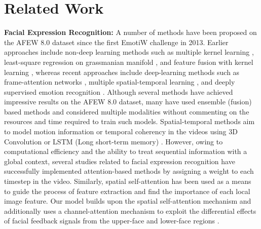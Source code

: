 \documentclass[runningheads]{llncs}
\begin{document}
\section{Related Work} \label{sec: related}
\textbf{Facial Expression Recognition:} A number of methods have been proposed on the AFEW 8.0 dataset \cite{dhall2012collecting} since the first EmotiW \cite{dhall2019emotiw} challenge in 2013. Earlier approaches include non-deep learning methods such as multiple kernel learning \cite{sikka2013multiple}, least-square regression on grassmanian manifold \cite{liu2013partial}, and feature fusion with kernel learning \cite{chen2014emotion}, whereas recent approaches include deep-learning methods such as frame-attention networks \cite{meng2019frame}, multiple spatial-temporal learning \cite{lu2018multiple}, and deeply supervised emotion recognition \cite{fan2018video}. Although several methods \cite{fan2018video,lu2018multiple,vielzeuf2017temporal,liu2018multi} have achieved impressive results on the AFEW 8.0 dataset, many have used ensemble (fusion) based methods and considered multiple modalities without commenting on the resources and time required to train such models. 
Spatial-temporal methods \cite{vielzeuf2017temporal,fan2016video} aim to model motion information or temporal coherency in the videos  using 3D Convolution \cite{tran2015learning} or LSTM (Long short-term memory) \cite{hochreiter1997long}. However, owing to computational efficiency and the ability to treat sequential information with a global context, several studies \cite{meng2019frame,aminbeidokhti2019emotion} related to facial expression recognition have successfully implemented attention-based methods by assigning a weight to each timestep in the video. Similarly, spatial self-attention has been used \cite{aminbeidokhti2019emotion,fang2019self,lin2017structured} as a means to guide the process of feature extraction and find the importance of each local image feature. Our model builds upon the spatial self-attention mechanism and additionally uses a channel-attention mechanism to exploit the differential effects of facial feedback signals from the upper-face and lower-face regions \cite{wang2020region,zeng2018false}. 
\end{document}
